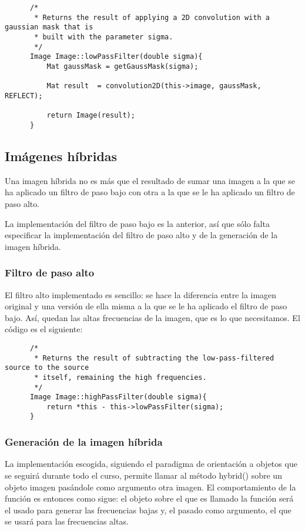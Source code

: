 \documentclass[a4paper, 11pt]{article}
\theoremstyle{definition}
\theoremstyle{theorem}
\begin{document}
  \begin{lstlisting}
      /*
       * Returns the result of applying a 2D convolution with a gaussian mask that is
       * built with the parameter sigma.
       */
      Image Image::lowPassFilter(double sigma){
          Mat gaussMask = getGaussMask(sigma);

          Mat result  = convolution2D(this->image, gaussMask, REFLECT);

          return Image(result);
      }
  \end{lstlisting}


  \subsection{Imágenes híbridas}
  Una imagen híbrida no es más que el resultado de sumar una imagen a la que se ha aplicado un filtro de paso bajo con otra a la que se le ha aplicado un filtro de paso alto.

  La implementación del filtro de paso bajo es la anterior, así que sólo falta especificar la implementación del filtro de paso alto y de la generación de la imagen híbrida.

  \subsubsection*{Filtro de paso alto}
  El filtro alto implementado es sencillo: se hace la diferencia entre la imagen original y una versión de ella misma a la que se le ha aplicado el filtro de paso bajo. Así, quedan las altas frecuencias de la imagen, que es lo que necesitamos. El código es el siguiente:

  \begin{lstlisting}
      /*
       * Returns the result of subtracting the low-pass-filtered source to the source
       * itself, remaining the high frequencies.
       */
      Image Image::highPassFilter(double sigma){
          return *this - this->lowPassFilter(sigma);
      }
  \end{lstlisting}

  \subsubsection*{Generación de la imagen híbrida}
  La implementación escogida, siguiendo el paradigma de orientación a objetos que se seguirá durante todo el curso, permite llamar al método hybrid() sobre un objeto imagen pasándole como argumento otra imagen. El comportamiento de la función es entonces como sigue: el objeto sobre el que es llamado la función será el usado para generar las frecuencias bajas y, el pasado como argumento, el que se usará para las frecuencias altas.
\end{document}

